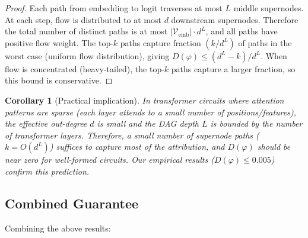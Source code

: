\documentclass[11pt]{article}
\newtheorem{corollary}[theorem]{Corollary}
\newcommand{\cV}{\mathcal{V}}
\newcommand{\1}{\mathbbm{1}}
\begin{document}
\begin{proof}
  Each path from embedding to logit traverses at most $L$ middle supernodes.
  At each step, flow is distributed to at most $d$ downstream supernodes.
  Therefore the total number of distinct paths is at most $|\cV_{\mathrm{emb}}| \cdot d^L$, and all paths have positive flow weight.
  The top-$k$ paths capture fraction $(k / d^L)$ of paths in the worst case (uniform flow distribution), giving $D(\varphi) \le (d^L - k)/d^L$.
  When flow is concentrated (heavy-tailed), the top-$k$ paths capture a larger fraction, so this bound is conservative.
\end{proof}

\begin{corollary}[Practical implication]
  In transformer circuits where attention patterns are sparse (each layer attends to a small number of positions/features), the effective out-degree $d$ is small and the DAG depth $L$ is bounded by the number of transformer layers.
  Therefore, a small number of supernode paths ($k = O(d^L)$) suffices to capture most of the attribution, and $D(\varphi)$ should be near zero for well-formed circuits.
  Our empirical results ($D(\varphi) \le 0.005$) confirm this prediction.
\end{corollary}

\subsection{Combined Guarantee}
\label{sec:combined-guarantee}

Combining the above results:
\end{document}
